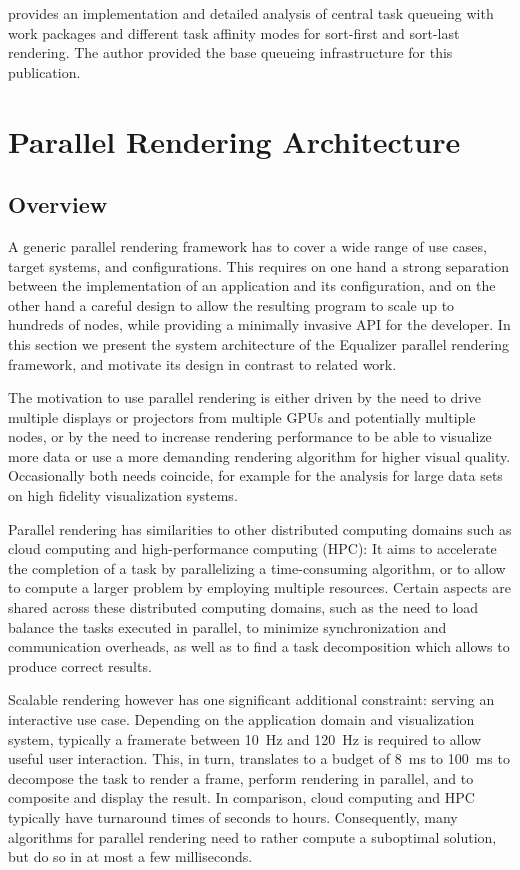 \cite{SPEP:16} provides an implementation and detailed analysis of central task
queueing with work packages and different task affinity modes for sort-first and
sort-last rendering. The author provided the   base queueing infrastructure for
this publication.

\chapter{Parallel Rendering Architecture}\label{sArchitecture}

\section{Overview}
A generic parallel rendering framework has to cover a wide range of use cases,
target systems, and configurations. This requires on one hand a strong
separation between the implementation of an application and its configuration,
and on the other hand a careful design to allow the resulting program to scale
up to hundreds of nodes, while providing a minimally invasive API for the
developer. In this section we present the system architecture of the Equalizer
parallel rendering framework, and motivate its design in contrast to related
work.

The motivation to use parallel rendering is either driven by the need to drive
multiple displays or projectors from multiple GPUs and potentially multiple
nodes, or by the need to increase rendering performance to be able to visualize
more data or use a more demanding rendering algorithm for higher visual quality.
Occasionally both needs coincide, for example for the analysis for large data
sets on high fidelity visualization systems.

Parallel rendering has similarities to other distributed computing domains such
as cloud computing and high-performance computing (HPC): It aims to accelerate
the completion of a task by parallelizing a time-consuming algorithm, or to
allow to compute a larger problem by employing multiple resources. Certain
aspects are shared across these distributed computing domains, such as the need
to load balance the tasks executed in parallel, to minimize synchronization and
communication overheads, as well as to find a task decomposition which allows
to produce correct results.

Scalable rendering however has one significant additional constraint: serving
an interactive use case. Depending on the application domain and visualization
system, typically a framerate between 10~Hz and 120~Hz is required to allow
useful user interaction. This, in turn, translates to a budget of 8~ms to
100~ms to decompose the task to render a frame, perform rendering in parallel,
and to composite and display the result. In comparison, cloud computing and
HPC typically have turnaround times of seconds to hours. Consequently, many
algorithms for parallel rendering need to rather compute a suboptimal solution,
but do so in at most a few milliseconds.

